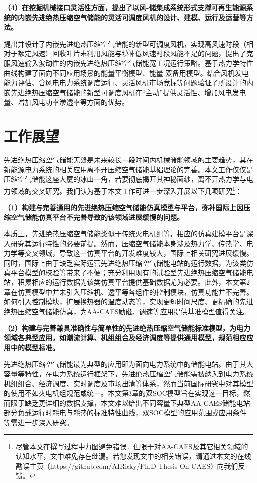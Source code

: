\textbf{（4）在挖掘机械接口灵活性方面，提出了以风-储集成系统形式支撑可再生能源系统的内嵌先进绝热压缩空气储能的灵活可调度风机的设计、建模、运行及运营等方法。}

提出并设计了内嵌先进绝热压缩空气储能的新型可调度风机，实现高风速时段（相对于额定风速）回收叶片未利用风能与填补低风速时段风能不足的问题，提出了克服风速输入波动性的内嵌先进绝热压缩空气储能宽工况运行策略。基于热力学特性曲线构建了面向不同应用场景的能量平衡模型、能量-双备用模型。结合风机发电能力评估、含风电电力系统调度运行、灵活风机市场竞标等问题验证了所设计的内嵌先进绝热压缩空气储能的新型可调度风机在“主动”提供灵活性、增加风电发电量、增加风电功率渗透率等方面的优势。

\section{工作展望}
\label{sec:overlook}
先进绝热压缩空气储能无疑是未来较长一段时间内机械储能领域的主要趋势，其在新能源电力系统的相关应用离不开压缩空气储能基础理论的完善。本文工作仅仅是压缩空气储能这座大厦的冰山一角，若要彻底揭开其神秘面纱，离不开热力学与电力领域的交叉研究。我们认为基于本文工作可进一步深入开展以下几项研究\footnote{尽管本文在撰写过程中力图避免错误，但限于对AA-CAES及其它相关领域的认知水平，文中难免存在纰漏。若您发现文中的相关错误，请通过本文的在线勘误主页（https://github.com/AIRicky/Ph.D-Thesis-On-CAES）向我们反馈。}：

\textbf{（1）构建与完善通用的先进绝热压缩空气储能仿真模型与平台，弥补国际上因压缩空气储能仿真平台不完善导致的该领域进展缓慢的问题。}

本质上，先进绝热压缩空气储能类似于传统火电机组等，相应的仿真建模平台是深入研究其运行特性的必要前提。然而，压缩空气储能本身涉及热力学、传热学、电力学等交叉领域，导致这一仿真平台的开发难度较大，国际上相关研究进展缓慢。同时，国际上由于缺乏实际运营先进绝热压缩空气储能电站的运行数据，为该类仿真平台模型的校验等带来了不便；充分利用现有的试验型先进绝热压缩空气储能电站，积累相应的运行数据为该类仿真平台提供基础数据尤为必要。此外，本文第2章在仿真模型中并未引入压缩机、透平等各组件的控制模块，仿真功能并不完善。如何引入控制模块，扩展换热器的温度动态等，实现更短时间尺度、更精确的先进绝热压缩空气储能仿真，为AA-CAES励磁、调速等应用提供基准模型值得关注。


\textbf{（2）构建与完善兼具准确性与简单性的先进绝热压缩空气储能标准模型，为电力领域各典型应用，如潮流计算、机组组合及经济调度等提供通用模型，规范相应应用中的模型标准。}

先进绝热压缩空气储能最为典型的应用即为面向电力系统中的储能电站。由于其大容量等特性，在电力系统运行框架下，先进绝热压缩空气储能需被纳入到电力系统机组组合、经济调度、实时调度及市场出清等体系，然而当前国际研究中对其模型的使用不如火电机组规范或统一。本文第3章的双SOC模型旨在实现这一目标，然而限于缺乏更详细的数据支撑，本文难以给出不同容量下典型AA-CAES储能电站部分负载运行时耗电与耗热的标准特性曲线，双SOC模型的应用范围或应用条件等需进一步深入研究。



